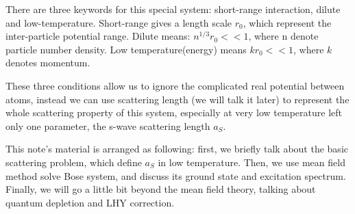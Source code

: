 There are three keywords for this special system: short-range interaction, dilute and low-temperature. 
Short-range gives a length scale $r_0$, which represent the inter-particle potential range. 
Dilute means: $n^{1/3}r_0<<1$, where n denote particle number density. 
Low temperature(energy) means $k r_0<<1$, where $k$ denotes momentum.

These three conditions allow us to ignore the complicated real potential between atoms, instead we can use scattering length (we will talk it later) to represent the whole scattering property of this system, especially at very low temperature left only one parameter, the s-wave scattering length $a_S$.

This note's material is arranged as following: first, we briefly talk about the basic scattering problem, which define $a_S$ in low temperature.
Then, we use mean field method solve Bose system, and discuss its ground state and excitation spectrum. Finally, we will go a little bit beyond the mean field theory, talking about quantum depletion and LHY correction.

